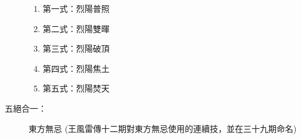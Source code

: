 \begin{description}
  \begin{multicols}{2}
    \begin{enumerate}
    \item 第一式：烈陽普照
    \item 第二式：烈陽雙暉
    \item 第三式：烈陽破頂
    \item 第四式：烈陽焦土
    \item 第五式：烈陽焚天
    \end{enumerate}
  \end{multicols}
\item[五絕合一：]東方無忌 (王風雷傳十二期對東方無忌使用的連續技，並在三十九期命名)
\end{description}


